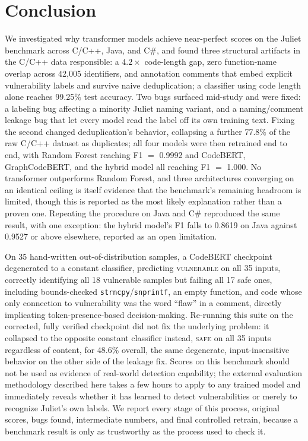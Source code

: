 \documentclass{ieeeaccess}
\begin{document}
\section{Conclusion}
\label{sec:conclusion}
We investigated why transformer models achieve near-perfect scores on the Juliet benchmark across C/C++, Java, and C\#, and found three structural artifacts in the C/C++ data responsible: a $4.2\times$ code-length gap, zero function-name overlap across 42{,}005 identifiers, and annotation comments that embed explicit vulnerability labels and survive naive deduplication; a classifier using code length alone reaches 99.25\% test accuracy. Two bugs surfaced mid-study and were fixed: a labeling bug affecting a minority Juliet naming variant, and a naming/comment leakage bug that let every model read the label off its own training text. Fixing the second changed deduplication's behavior, collapsing a further 77.8\% of the raw C/C++ dataset as duplicates; all four models were then retrained end to end, with Random Forest reaching F1 $=$ 0.9992 and CodeBERT, GraphCodeBERT, and the hybrid model all reaching F1 $=$ 1.000. No transformer outperforms Random Forest, and three architectures converging on an identical ceiling is itself evidence that the benchmark's remaining headroom is limited, though this is reported as the most likely explanation rather than a proven one. Repeating the procedure on Java and C\# reproduced the same result, with one exception: the hybrid model's F1 falls to 0.8619 on Java against 0.9527 or above elsewhere, reported as an open limitation.

On 35 hand-written out-of-distribution samples, a CodeBERT checkpoint degenerated to a constant classifier, predicting \textsc{vulnerable} on all 35 inputs, correctly identifying all 18 vulnerable samples but failing all 17 safe ones, including bounds-checked \texttt{strncpy}/\texttt{snprintf}, an empty function, and code whose only connection to vulnerability was the word ``flaw'' in a comment, directly implicating token-presence-based decision-making. Re-running this suite on the corrected, fully verified checkpoint did not fix the underlying problem: it collapsed to the opposite constant classifier instead, \textsc{safe} on all 35 inputs regardless of content, for 48.6\% overall, the same degenerate, input-insensitive behavior on the other side of the leakage fix. Scores on this benchmark should not be used as evidence of real-world detection capability; the external evaluation methodology described here takes a few hours to apply to any trained model and immediately reveals whether it has learned to detect vulnerabilities or merely to recognize Juliet's own labels. We report every stage of this process, original scores, bugs found, intermediate numbers, and final controlled retrain, because a benchmark result is only as trustworthy as the process used to check it.
\end{document}
